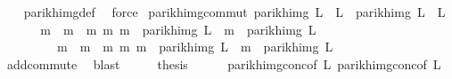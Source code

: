 \begin{isabellebody}
%
\isadelimproof
\ \ %
\endisadelimproof
%
\isatagproof
{}\isamarkupfalse%
\ parikh{\isacharunderscore}{\kern0pt}img{\isacharunderscore}{\kern0pt}def\ \isamarkupfalse%
\ force%
\endisatagproof
{\isafoldproof}%
%
\isadelimproof
\isanewline
%
\endisadelimproof
\isanewline
{}\isamarkupfalse%
\ parikh{\isacharunderscore}{\kern0pt}img{\isacharunderscore}{\kern0pt}commut{\isacharcolon}{\kern0pt}\ {\isachardoublequoteopen}parikh{\isacharunderscore}{\kern0pt}img\ {\isacharparenleft}{\kern0pt}L{}\ {\isacharat}{\kern0pt}{\isacharat}{\kern0pt}\ L{}{\isacharparenright}{\kern0pt}\ {\isacharequal}{\kern0pt}\ parikh{\isacharunderscore}{\kern0pt}img\ {\isacharparenleft}{\kern0pt}L{}\ {\isacharat}{\kern0pt}{\isacharat}{\kern0pt}\ L{}{\isacharparenright}{\kern0pt}{\isachardoublequoteclose}\isanewline
%
\isadelimproof
%
\endisadelimproof
%
\isatagproof
{}\isamarkupfalse%
\ {\isacharminus}{\kern0pt}\isanewline
\ \ \isamarkupfalse%
\ {\isachardoublequoteopen}{\isacharbraceleft}{\kern0pt}\ m{}\ {\isacharplus}{\kern0pt}\ m{}\ {\isacharbar}{\kern0pt}\ m{}\ m{}{\isachardot}{\kern0pt}\ m{}\ {\isasymin}\ parikh{\isacharunderscore}{\kern0pt}img\ L{}\ {\isasymand}\ m{}\ {\isasymin}\ parikh{\isacharunderscore}{\kern0pt}img\ L{}\ {\isacharbraceright}{\kern0pt}\ {\isacharequal}{\kern0pt}\ \isanewline
\ \ \ \ \ \ \ \ {\isacharbraceleft}{\kern0pt}\ m{}\ {\isacharplus}{\kern0pt}\ m{}\ {\isacharbar}{\kern0pt}\ m{}\ m{}{\isachardot}{\kern0pt}\ m{}\ {\isasymin}\ parikh{\isacharunderscore}{\kern0pt}img\ L{}\ {\isasymand}\ m{}\ {\isasymin}\ parikh{\isacharunderscore}{\kern0pt}img\ L{}\ {\isacharbraceright}{\kern0pt}{\isachardoublequoteclose}\isanewline
\ \ \ \ \isamarkupfalse%
\ add{\isachardot}{\kern0pt}commute\ \isamarkupfalse%
\ blast\isanewline
\ \ \isamarkupfalse%
\ \isamarkupfalse%
\ {\isacharquery}{\kern0pt}thesis\isanewline
\ \ \ \ \isamarkupfalse%
\ parikh{\isacharunderscore}{\kern0pt}img{\isacharunderscore}{\kern0pt}conc{\isacharbrackleft}{\kern0pt}of\ L{}{\isacharbrackright}{\kern0pt}\ parikh{\isacharunderscore}{\kern0pt}img{\isacharunderscore}{\kern0pt}conc{\isacharbrackleft}{\kern0pt}of\ L{}{\isacharbrackright}{\kern0pt}\ \isamarkupfalse%

\end{isabellebody}
